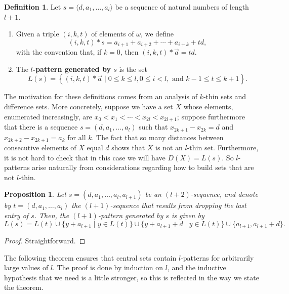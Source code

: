 \documentclass{amsart}
\newtheorem{proposition}[theorem]{Proposition}
\theoremstyle{definition}
\newtheorem{definition}[theorem]{Definition}
\theoremstyle{remark}
\numberwithin{equation}{section}
\begin{document}
\begin{definition}
Let $s=\langle d,a_1,\ldots,a_l\rangle$ be a sequence of natural numbers of length $l+1$.
\begin{enumerate}
    \item Given a triple $(i,k,t)$ of elements of $\omega$, we define
\begin{equation*}
    (i,k,t)*s=a_{i+1}+a_{i+2}+\cdots+a_{i+k}+td,
\end{equation*}
with the convention that, if $k=0$, then $(i,k,t)*\vec{a}=td$.
    \item The {\bf $l$-pattern generated by $s$} is the set
\begin{equation*}
    L(s)=\left\{(i,k,t)*\vec{a}\mid 0\leq k\leq l,0\leq i<l,\text{ and }k-1\leq t\leq k+1\right\}.
\end{equation*}
\end{enumerate}
\end{definition}

The motivation for these definitions comes from an analysis of $k$-thin sets and difference sets. More concretely, suppose we have a set $X$ whose elements, enumerated increasingly, are $x_0<x_1<\cdots<x_{2l}<x_{2l+1}$; suppose furthermore that there is a sequence $s=(d,a_1,\ldots,a_l)$ such that $x_{2k+1}-x_{2k}=d$ and $x_{2k+2}-x_{2k+1}=a_k$ for all $k$. The fact that so many distances between consecutive elements of $X$ equal $d$ shows that $X$ is not an $l$-thin set. Furthermore, it is not hard to check that in this case we will have $D(X)=L(s)$. So $l$-patterns arise naturally from considerations regarding how to build sets that are not $l$-thin.

\begin{proposition}
Let $s=(d,a_1,\ldots,a_l,a_{l+1})$ be an $(l+2)$-sequence, and denote by $t=(d,a_1,\ldots,a_l)$ the $(l+1)$-sequence that results from dropping the last entry of $s$. Then, the $(l+1)$-pattern generated by $s$ is given by
\begin{equation*}
    L(s)=L(t)\cup\{y+a_{l+1}\mid y\in L(t)\}\cup\{y+a_{l+1}+d\mid y\in L(t)\}\cup\{a_{l+1},a_{l+1}+d\}.
\end{equation*}
\end{proposition}

\begin{proof}
Straightforward.
\end{proof}

The following theorem ensures that central sets contain $l$-patterns for arbitrarily large values of $l$. The proof is done by induction on $l$, and the inductive hypothesis that we need is a little stronger, so this is reflected in the way we state the theorem.
\end{document}
